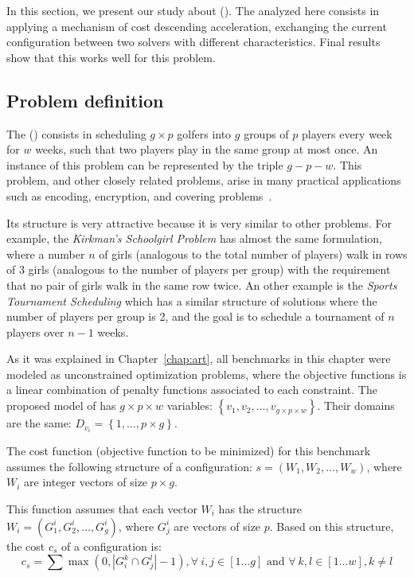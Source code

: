 In this section, we present our study about \sgp{} (\SGP). The \commstr{} analyzed here consists in applying a mechanism of cost descending acceleration, exchanging the current configuration between two solvers with different characteristics. Final results show that this \commstr{} works well for this problem.

\subsection{Problem definition}

The \sgp{} (\SGP) consists in scheduling $g\times p$ golfers into $g$ groups of $p$ players every week for $w$ weeks, such that two players play in the same group at most once. An instance of this problem can be represented by the triple $g-p-w$. This problem, and other closely related problems, arise in many practical applications such as encoding, encryption, and covering problems~\cite{Lardeux2014}. 

Its structure is very attractive because it is very similar to other problems. For example, the \textit{Kirkman's Schoolgirl Problem} has almost the same formulation, where a number $n$ of girls (analogous to the total number of players) walk in rows of 3 girls (analogous to the number of players per group) with the requirement that no pair of girls walk in the same row twice. An other example is the \textit{Sports Tournament Scheduling} which has a similar structure of solutions where the number of players per group is 2, and the goal is to schedule a tournament of $n$ players over $n-1$ weeks. %

As it was explained in Chapter~\ref{chap:art}, all benchmarks in this chapter were modeled as unconstrained optimization problems, where the objective functions is a linear combination of penalty functions associated to each constraint. The proposed model of \SGP{} has $g\times p\times w$ variables: $\left\{v_1, v_2, \dots, v_{g\times p\times w}\right\}$. Their domains are the same: ${D_{v_i}=\left\{1, \dots, p\times g\right\}}$.

The cost function (objective function to be minimized) for this benchmark assumes the following structure of a configuration: $s=\left(W_1, W_2, \dots, W_w\right)$, where $W_i$ are integer vectors of size $p\times g$.

This function assumes that each vector $W_i$ has the structure $W_i = \left(G_1^i, G_2^i, \dots, G_g^i\right)$, where $G_j^i$ are vectors of size $p$. Based on this structure, the cost $c_s$ of a configuration is: 
\begin{equation}\label{func:cost_sgp}
c_s=\sum{}{}{\max\left(0,\left|G_i^k \cap G_j^l\right|-1\right), \forall~i,j \in [1\dots g] \text{ and } \forall~k,l \in [1\dots w], k\neq l}
\end{equation}

